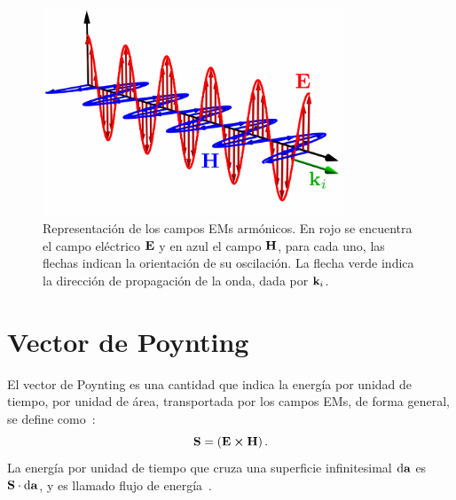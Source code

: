 \begin{figure}[ht!]
	\centering
	\includegraphics[width=9cm]{1-Capitulo-Repaso/0-Diagramas/campos.pdf}\vspace*{-0.3cm}
	\caption[Campo eléctromagnetico armónico]{Representación de los campos EMs armónicos. En rojo se encuentra el campo eléctrico $\vb{E}$ y en azul el campo $\vb{H}$, para cada uno, las flechas indican la orientación de su oscilación. La flecha verde indica la dirección de propagación de la onda, dada por $\vb{k}_{i}$.}\label{fig:EHFields}
\end{figure}

\section{Vector de Poynting}

El vector de Poynting es una cantidad que indica la energía por unidad de tiempo, por unidad de área, transportada por los campos EMs, de forma general, se define como~\cite{griffiths2013electrodynamics}:
\begin{equation}
\vb{S}=\left(\vb{E} \cross \vb{H}\right).
\label{eq:poynting}
\end{equation}
La energía por unidad de tiempo que cruza una superficie infinitesimal $\dd{\vb{a}}$ es $\vb{S}\cdot\dd{\vb{a}}$, y es llamado flujo de energía~\cite{griffiths2013electrodynamics}.\\

